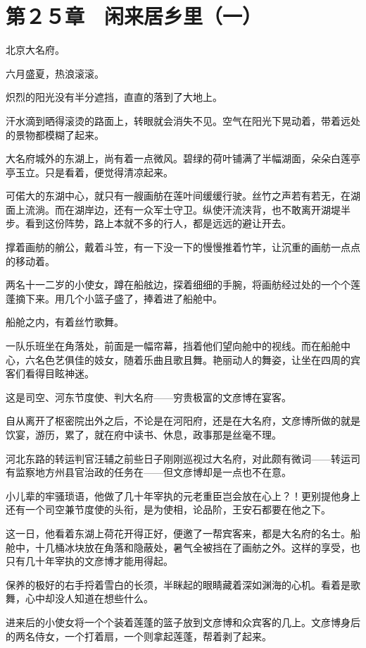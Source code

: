 \section{第２５章　闲来居乡里（一）}

北京大名府。

六月盛夏，热浪滚滚。

炽烈的阳光没有半分遮挡，直直的落到了大地上。

汗水滴到晒得滚烫的路面上，转眼就会消失不见。空气在阳光下晃动着，带着远处的景物都模糊了起来。

大名府城外的东湖上，尚有着一点微风。碧绿的荷叶铺满了半幅湖面，朵朵白莲亭亭玉立。只是看着，便觉得清凉起来。

可偌大的东湖中心，就只有一艘画舫在莲叶间缓缓行驶。丝竹之声若有若无，在湖面上流淌。而在湖岸边，还有一众军士守卫。纵使汗流浃背，也不敢离开湖堤半步。看到这份阵势，路上本就不多的行人，都是远远的避让开去。

撑着画舫的艄公，戴着斗笠，有一下没一下的慢慢推着竹竿，让沉重的画舫一点点的移动着。

两名十一二岁的小使女，蹲在船舷边，探着细细的手腕，将画舫经过处的一个个莲蓬摘下来。用几个小篮子盛了，捧着进了船舱中。

船舱之内，有着丝竹歌舞。

一队乐班坐在角落处，前面是一幅帘幕，挡着他们望向舱中的视线。而在船舱中心，六名色艺俱佳的妓女，随着乐曲且歌且舞。艳丽动人的舞姿，让坐在四周的宾客们看得目眩神迷。

这是司空、河东节度使、判大名府——穷贵极富的文彦博在宴客。

自从离开了枢密院出外之后，不论是在河阳府，还是在大名府，文彦博所做的就是饮宴，游历，累了，就在府中读书、休息，政事那是丝毫不理。

河北东路的转运判官汪辅之前些日子刚刚巡视过大名府，对此颇有微词——转运司有监察地方州县官治政的任务在——但文彦博却是一点也不在意。

小儿辈的牢骚琐语，他做了几十年宰执的元老重臣岂会放在心上？！更别提他身上还有一个司空兼节度使的头衔，是为使相，论品阶，王安石都要在他之下。

这一日，他看着东湖上荷花开得正好，便邀了一帮宾客来，都是大名府的名士。船舱中，十几桶冰块放在角落和隐蔽处，暑气全被挡在了画舫之外。这样的享受，也只有几十年宰执的文彦博才能用得起。

保养的极好的右手捋着雪白的长须，半眯起的眼睛藏着深如渊海的心机。看着是歌舞，心中却没人知道在想些什么。

进来后的小使女将一个个装着莲蓬的篮子放到文彦博和众宾客的几上。文彦博身后的两名侍女，一个打着扇，一个则拿起莲蓬，帮着剥了起来。


